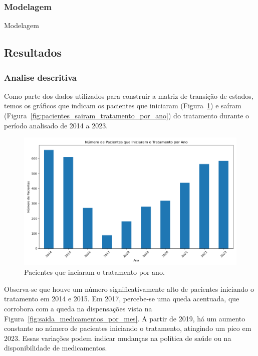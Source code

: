 \documentclass[article,a4paper,12pt,brazil,sumario=tradicional]{abntex2}
\begin{document}
\subsubsection{Modelagem}

Modelagem

\subsection{Resultados}

\subsubsection{Analise descritiva}

Como parte dos dados utilizados para construir a matriz de transição de estados, temos os gráficos que indicam os pacientes que iniciaram (Figura~\ref{fig:pacientes_iniciaram_tratamento_por_ano}) e saíram (Figura~\ref{fig:pacientes_sairam_tratamento_por_ano}) do tratamento durante o período analisado de 2014 a 2023.

\begin{figure}[!ht]
    \centering
    \includegraphics[width=1\textwidth]{pacientes_iniciaram_tratamento_por_ano.png}
    \caption{Pacientes que inciaram o tratamento por ano.}
    \label{fig:pacientes_iniciaram_tratamento_por_ano}
\end{figure}

Observa-se que houve um número significativamente alto de pacientes iniciando o tratamento em 2014 e 2015. Em 2017, percebe-se uma queda acentuada, que corrobora com a queda na dispensações vista na Figura~\ref{fig:saida_medicamentos_por_mes}. A partir de 2019, há um aumento constante no número de pacientes iniciando o tratamento, atingindo um pico em 2023. Essas variações podem indicar mudanças na política de saúde ou na disponibilidade de medicamentos.
\end{document}
